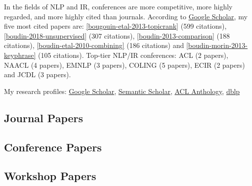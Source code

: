 In the fields of NLP and IR, conferences are more competitive, more highly regarded, and more highly cited than journals.
%
According to \href{https://scholar.google.com/citations?user=Vk68rbkAAAAJ}{Google Scholar}, my five most cited papers are: 
\ref{bougouin-etal-2013-topicrank} {\small (599 citations)}, 
\ref{boudin-2018-unsupervised} {\small (307 citations)}, 
\ref{boudin-2013-comparison} {\small (188 citations)},
\ref{boudin-etal-2010-combining} {\small (186 citations)} and 
\ref{boudin-morin-2013-keyphrase} {\small (105 citations)}.
%
Top-tier NLP/IR conferences: 
ACL {\small (2 papers)}, 
NAACL {\small (4 papers)}, 
EMNLP {\small (3 papers)}, 
COLING {\small (5 papers)}, 
ECIR {\small (2 papers)} and 
JCDL {\small (3 papers)}.

\vspace{1em}

My research profiles: 
\href{https://scholar.google.com/citations?user=Vk68rbkAAAAJ}{Google Scholar}, 
\href{https://www.semanticscholar.org/author/Florian-Boudin/2346578}{Semantic Scholar},
\href{https://aclanthology.org/people/f/florian-boudin/}{ACL Anthology},
\href{https://dblp.org/pid/54/2762.html}{dblp}


\subsection{Journal Papers}

\begin{enumerate}[label=(J{\scriptsize\arabic*}),font=\small\bfseries\color{VioletRed},itemsep=0cm]
    
\end{enumerate}

\subsection{Conference Papers}

\begin{enumerate}[label=(C{\scriptsize\arabic*}),font=\small\bfseries\color{VioletRed},itemsep=0cm]
    
\end{enumerate}

\subsection{Workshop Papers}

\begin{enumerate}[label=(W{\scriptsize\arabic*}),font=\small\bfseries\color{VioletRed},itemsep=0cm]
    
\end{enumerate}

